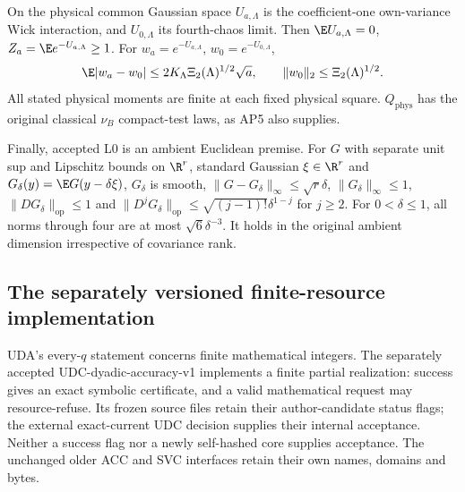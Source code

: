 On the physical common Gaussian space $U_{a,\Lambda}$ is the
coefficient-one own-variance Wick interaction, and $U_{0,\Lambda}$ its
fourth-chaos limit. Then $\E U_{a,\Lambda}=0$,
$Z_a=\E e^{-U_{a,\Lambda}}\ge1$. For $w_a=e^{-U_{a,\Lambda}}$,
$w_0=e^{-U_{0,\Lambda}}$,
\[
 \E|w_a-w_0|\le2K_\Lambda\Xi_2(\Lambda)^{1/2}\sqrt a,
 \qquad\|w_0\|_2\le\Xi_2(\Lambda)^{1/2}.
\]
All stated physical moments are finite at each fixed physical square.
$Q_{\mathrm{phys}}$ has the original classical $\nu_B$ compact-test laws,
as AP5 also supplies.

Finally, accepted L0 is an ambient Euclidean premise. For $G$ with separate
unit sup and Lipschitz bounds on $\R^r$, standard Gaussian $\xi\in\R^r$
and $G_\delta(y)=\E G(y-\delta\xi)$, $G_\delta$ is smooth,
$\|G-G_\delta\|_\infty\le\sqrt r\delta$,
$\|G_\delta\|_\infty\le1$, $\|DG_\delta\|_{\mathrm{op}}\le1$ and
$\|D^jG_\delta\|_{\mathrm{op}}\le\sqrt{(j-1)!}\delta^{1-j}$ for $j\ge2$.
For $0<\delta\le1$, all norms through four are at most $\sqrt6\delta^{-3}$.
It holds in the original ambient dimension irrespective of covariance rank.


\subsection{The separately versioned finite-resource implementation}
\label{udc:contract}
UDA's every-$q$ statement concerns finite mathematical integers. The
separately accepted UDC-dyadic-accuracy-v1 implements a finite partial
realization: success gives an exact symbolic certificate, and a valid
mathematical request may resource-refuse. Its frozen source files retain
their author-candidate status flags; the external exact-current UDC decision
supplies their internal acceptance. Neither a success flag nor a newly
self-hashed core supplies acceptance. The unchanged older ACC and SVC
interfaces retain their own names, domains and bytes.


